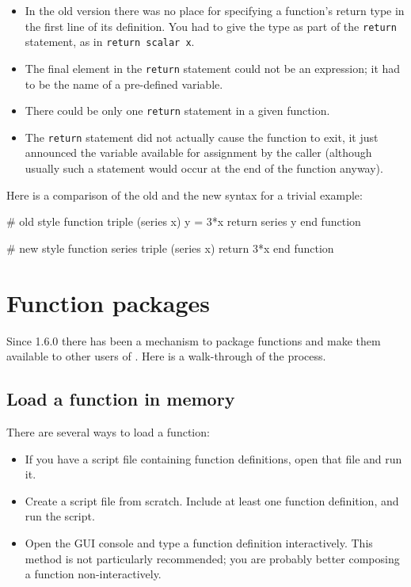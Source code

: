 \begin{itemize}
\item In the old version there was no place for specifying a
  function's return type in the first line of its definition.  You had
  to give the type as part of the \texttt{return} statement, as in
  \texttt{return scalar x}.
\item The final element in the \texttt{return} statement could not be
  an expression; it had to be the name of a pre-defined variable.
\item There could be only one \texttt{return} statement in a given
  function.
\item The \texttt{return} statement did not actually cause the
  function to exit, it just announced the variable available for
  assignment by the caller (although usually such a statement
  would occur at the end of the function anyway).
\end{itemize}

Here is a comparison of the old and the new syntax for a trivial
example:
%
\begin{code}
# old style
function triple (series x)
  y = 3*x
  return series y
end function

# new style  
function series triple (series x)
  return 3*x
end function
\end{code}


\section{Function packages}
\label{sec:func-packages}

Since  1.6.0 there has been a mechanism to package
functions and make them available to other users of .  Here
is a walk-through of the process.

\subsection{Load a function in memory}

There are several ways to load a function:

\begin{itemize}
\item If you have a script file containing function definitions, open
  that file and run it.
\item Create a script file from scratch.  Include at least one
  function definition, and run the script.
\item Open the GUI console and type a function definition
  interactively.  This method is not particularly recommended; you are
  probably better composing a function non-interactively.
\end{itemize}

